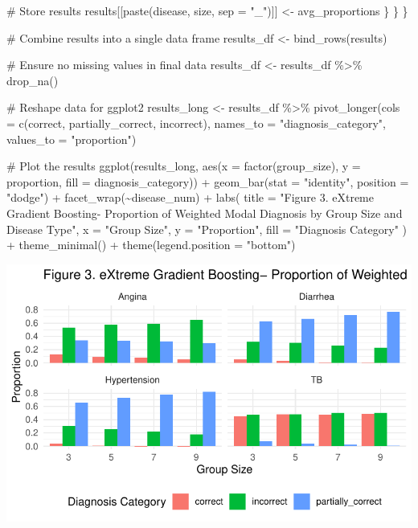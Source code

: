 \documentclass[
  letterpaper,
  DIV=11,
  numbers=noendperiod]{scrartcl}
\newenvironment{Shaded}{\begin{snugshade}}{\end{snugshade}}
\newcommand{\AttributeTok}[1]{\textcolor[rgb]{0.40,0.45,0.13}{#1}}
\newcommand{\CommentTok}[1]{\textcolor[rgb]{0.37,0.37,0.37}{#1}}
\newcommand{\FunctionTok}[1]{\textcolor[rgb]{0.28,0.35,0.67}{#1}}
\newcommand{\NormalTok}[1]{\textcolor[rgb]{0.00,0.23,0.31}{#1}}
\newcommand{\OtherTok}[1]{\textcolor[rgb]{0.00,0.23,0.31}{#1}}
\newcommand{\SpecialCharTok}[1]{\textcolor[rgb]{0.37,0.37,0.37}{#1}}
\newcommand{\StringTok}[1]{\textcolor[rgb]{0.13,0.47,0.30}{#1}}
\begin{document}
\begin{Shaded}
\begin{Highlighting}[]
      \CommentTok{\# Store results}
\NormalTok{      results[[}\FunctionTok{paste}\NormalTok{(disease, size, }\AttributeTok{sep =} \StringTok{"\_"}\NormalTok{)]] }\OtherTok{\textless{}{-}}\NormalTok{ avg\_proportions}
\NormalTok{    \}}
\NormalTok{  \}}
\NormalTok{\}}

\CommentTok{\# Combine results into a single data frame}
\NormalTok{results\_df }\OtherTok{\textless{}{-}} \FunctionTok{bind\_rows}\NormalTok{(results)}

\CommentTok{\# Ensure no missing values in final data}
\NormalTok{results\_df }\OtherTok{\textless{}{-}}\NormalTok{ results\_df }\SpecialCharTok{\%\textgreater{}\%}
  \FunctionTok{drop\_na}\NormalTok{()}

\CommentTok{\# Reshape data for ggplot2}
\NormalTok{results\_long }\OtherTok{\textless{}{-}}\NormalTok{ results\_df }\SpecialCharTok{\%\textgreater{}\%}
  \FunctionTok{pivot\_longer}\NormalTok{(}\AttributeTok{cols =} \FunctionTok{c}\NormalTok{(correct, partially\_correct, incorrect),}
               \AttributeTok{names\_to =} \StringTok{"diagnosis\_category"}\NormalTok{,}
               \AttributeTok{values\_to =} \StringTok{"proportion"}\NormalTok{)}

\CommentTok{\# Plot the results}
\FunctionTok{ggplot}\NormalTok{(results\_long, }\FunctionTok{aes}\NormalTok{(}\AttributeTok{x =} \FunctionTok{factor}\NormalTok{(group\_size), }\AttributeTok{y =}\NormalTok{ proportion, }\AttributeTok{fill =}\NormalTok{ diagnosis\_category)) }\SpecialCharTok{+}
  \FunctionTok{geom\_bar}\NormalTok{(}\AttributeTok{stat =} \StringTok{"identity"}\NormalTok{, }\AttributeTok{position =} \StringTok{"dodge"}\NormalTok{) }\SpecialCharTok{+}
  \FunctionTok{facet\_wrap}\NormalTok{(}\SpecialCharTok{\textasciitilde{}}\NormalTok{disease\_num) }\SpecialCharTok{+}
  \FunctionTok{labs}\NormalTok{(}
    \AttributeTok{title =} \StringTok{"Figure 3. eXtreme Gradient Boosting{-} Proportion of Weighted Modal Diagnosis by Group Size and Disease Type"}\NormalTok{,}
    \AttributeTok{x =} \StringTok{"Group Size"}\NormalTok{,}
    \AttributeTok{y =} \StringTok{"Proportion"}\NormalTok{,}
    \AttributeTok{fill =} \StringTok{"Diagnosis Category"}
\NormalTok{  ) }\SpecialCharTok{+}
  \FunctionTok{theme\_minimal}\NormalTok{() }\SpecialCharTok{+}
  \FunctionTok{theme}\NormalTok{(}\AttributeTok{legend.position =} \StringTok{"bottom"}\NormalTok{)}
\end{Highlighting}
\end{Shaded}

\includegraphics{simulation_files/figure-pdf/unnamed-chunk-5-1.pdf}
\end{document}
